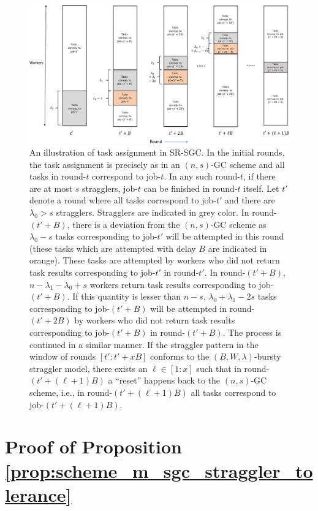 \begin{figure}
		\centering
		\includegraphics[scale=0.44]{figs/ch2/fig_SR_SGC_v2}
		\caption{An illustration of task assignment in SR-SGC. In the initial rounds, the task assignment is precisely as in an $(n,s)$-GC scheme and all tasks in round-$t$ correspond to job-$t$.  In any such round-$t$, if there are at most $s$ stragglers, job-$t$ can be finished in round-$t$ itself. Let $t'$ denote a round where all tasks correspond to job-$t'$ and there are $\lambda_0>s$ stragglers. Stragglers are indicated in grey color. In round-$(t'+B)$, there is a deviation from the $(n,s)$-GC scheme as $\lambda_0-s$ tasks corresponding to job-$t'$ will be attempted in this round (these tasks which are attempted with delay $B$ are indicated in orange). These tasks are attempted by workers who did not return task results corresponding to job-$t'$ in round-$t'$. In round-$(t'+B)$, $n-\lambda_1-\lambda_0+s$ workers return task results corresponding to job-$(t'+B)$. If this quantity is lesser than $n-s$, $\lambda_0+\lambda_1-2s$ tasks corresponding to job-$(t'+B)$ will be attempted in round-$(t'+2B)$ by workers who did not return task results corresponding to job-$(t'+B)$ in round-$(t'+B)$. The process is continued in a similar manner. If the straggler pattern in the window of rounds $[t':t'+xB]$ conforms to the $(B,W,\lambda)$-bursty straggler model, there exists an $\ell\in[1:x]$ such that in round-$(t'+(\ell+1)B)$ a ``reset'' happens back to the $(n,s)$-GC scheme, i.e., in round-$(t'+(\ell+1)B)$ all tasks correspond to job-$(t'+(\ell+1)B)$.}
		\label{fig:sr_sgc_scheme}
\end{figure}

\clearpage

\section{Proof of Proposition \ref{prop:scheme_m_sgc_straggler_tolerance}}\label{app:proof_of_working_constr_b_sgc}


